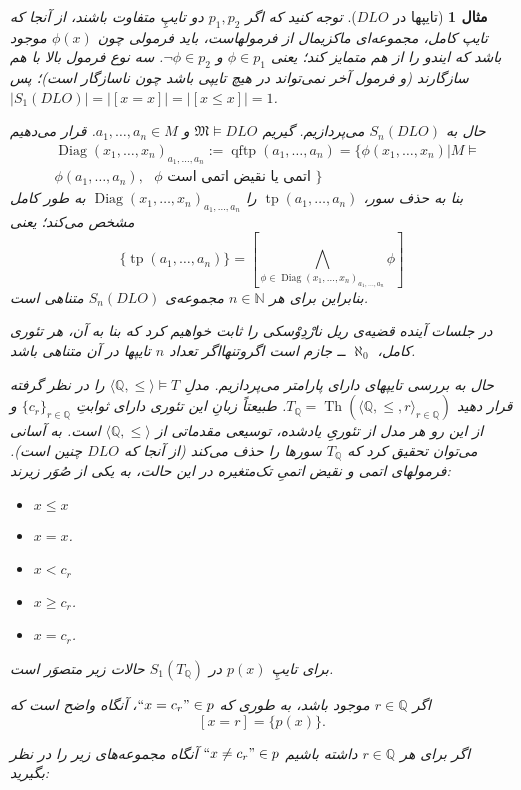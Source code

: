 \documentclass[12pt,a4paper]{article}
\theoremstyle{colorhead}
\newtheorem{mesal}[thm]{مثال}
\DeclareMathOperator{\Th}{Th}
\DeclareMathOperator{\diag}{Diag}
\DeclareMathOperator{\qftp}{qftp}
\DeclareMathOperator{\tp}{tp}
\begin{document}
\begin{mesal}[تایپها در
$DLO$]
توجه کنید که اگر 
$p_1,p_2$
دو تایپِ متفاوت باشند، از آنجا که تایپ کامل، مجموعه‌ای ماکزیمال از فرمولهاست، باید
فرمولی چون
$\phi(x)$
موجود باشد که ایندو را از هم متمایز کند؛ یعنی
$\phi\in p_1$
و
$\neg \phi\in p_2$.
سه نوع فرمول بالا با هم سازگارند (و فرمول آخر نمی‌تواند در هیچ تایپی باشد چون ناسازگار است)؛ پس
$|S_1(DLO)|=|[x=x]|=|[x\leq x]|=1$.
\par 
حال به
$S_n(DLO)$
می‌پردازیم.
گیریم
$\mathfrak{M}\models DLO$
و
$a_1,\ldots,a_n\in M$.
قرار می‌دهیم
\begin{align*}
&
\diag(x_1,\ldots,x_n)_{a_1,\ldots,a_n}:=\qftp(a_1,\ldots,a_n)=
\{\phi(x_1,\ldots,x_n)|M\models \\
&
\phi(a_1,\ldots,a_n), \text{ $\phi$ اتمی یا نقیض اتمی است }
\}
\end{align*}
بنا به حذف سور،
$\tp(a_1,\ldots,a_n)$
را
$\diag(x_1,\ldots,x_n)_{a_1,\ldots,a_n}$
به طور کامل مشخص می‌کند؛ یعنی
\[
\{\tp(a_1,\ldots,a_n)\}=[\bigwedge_{\phi\in \diag(x_1,\ldots,x_n)_{a_1,\ldots,a_n} }\phi]
\]
بنابراین
برای هر
$n\in \mathbb{N}$
مجموعه‌ی
$S_n(DLO)$
متناهی است.
\par 
در جلسات آینده قضیه‌ی
ریل‌ نارْدِوْسکی
را ثابت خواهیم کرد که بنا به آن، هر تئوری کامل،
$\aleph_0$
ــ
جازم است اگروتنهااگر تعداد
$n$
تایپها در آن متناهی باشد. 
\par 
حال به بررسی تایپهای دارای پارامتر می‌پردازیم. مدلِ
$\langle \mathbb{Q},\leq\rangle \models T$
را در نظر گرفته قرار دهید
$T_\mathbb{Q}=\Th(\langle\mathbb{Q},\leq,r\rangle_{r\in \mathbb{Q}})$.
طبیعتاً زبانِ این تئوری دارای ثوابتِ
$\{c_r\}_{r\in \mathbb{Q}}$
و از این رو هر مدل از تئوریِ یادشده، توسیعی مقدماتی از
$\langle \mathbb{Q},\leq\rangle$
است. 
به آسانی می‌توان تحقیق کرد که
$T_\mathbb{Q}$
سورها را حذف می‌کند (از آنجا که
$DLO$
چنین است). فرمولهای اتمی و نقیض اتمیِ تک‌متغیره در این حالت، به یکی از صُوَر زیرند:
\begin{itemize}
\item $x\leq x$
\item $x=x$.
\item $x<c_r$
\item $x\geq c_r$.
\item $x=c_r$.
\end{itemize}
برای تایپِ
$p(x)$
 در
$S_1(T_\mathbb{Q})$
حالات زیر متصوَر است.
\par 
اگر
$r\in \mathbb{Q}$
موجود باشد، به طوری که 
$``x=c_r"\in p$، 
آنگاه واضح است که 
\[
[x=r]=\{p(x)\}.
\]
\item
اگر
برای هر
$r\in \mathbb{Q}$
داشته باشیم
$``x\not=c_r"\in p$
آنگاه مجموعه‌های زیر را در نظر بگیرید:

\end{mesal}
\end{document}
